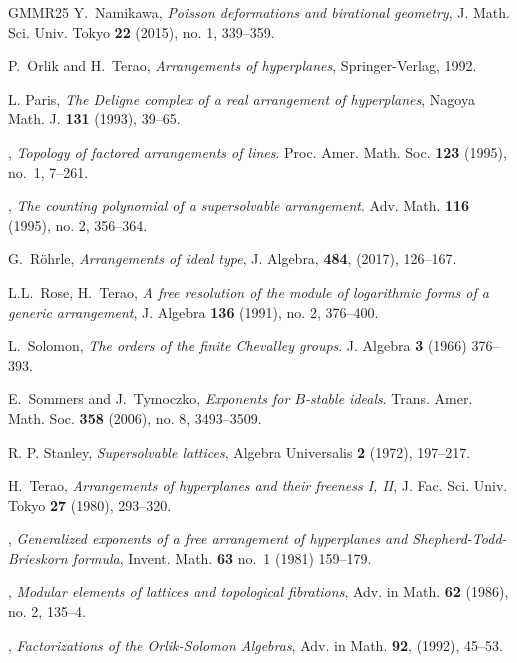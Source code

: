 \documentclass[12pt]{amsart}
\numberwithin{equation}{section}
\theoremstyle{plain}
\theoremstyle{definition}
\begin{document}
\begin{thebibliography}{GMMR25}
  Y.~Namikawa, \emph{Poisson deformations and birational geometry}, J. Math. Sci. Univ. Tokyo \textbf{22} (2015), no. 1, 339--359.

 P.~Orlik and H.~Terao,
  \emph{Arrangements of hyperplanes}, Springer-Verlag, 1992.

L. Paris,
\emph{The Deligne complex of a real arrangement of hyperplanes},
Nagoya Math. J. \textbf{131} (1993), 39--65.

\bysame, %
\emph{Topology of factored arrangements of lines}.
Proc. Amer. Math. Soc. \textbf{123} (1995), no.~1, 7--261.

\bysame, %
\emph{The counting polynomial of a supersolvable arrangement}. 
Adv. Math. \textbf{116} (1995), no. 2, 356--364. 


G.~R\"ohrle,
\emph{Arrangements of ideal type},
J. Algebra, \textbf{484},  (2017), 126--167.


L.L.~Rose, H.~Terao, 
\emph{A free resolution of the module of logarithmic forms of a generic arrangement},
J. Algebra \textbf{136} (1991), no. 2, 376--400.

L.~Solomon, 
\emph{The orders of the finite Chevalley groups}.
J. Algebra \textbf{3} (1966) 376--393. 


E.~Sommers and J.~Tymoczko, 
\emph{Exponents for $B$-stable ideals}. 
Trans. Amer. Math. Soc. \textbf{358} (2006), no. 8, 3493--3509. 

R. P. Stanley, 
\emph{Supersolvable lattices},
Algebra Universalis \textbf{2} (1972), 197--217. 


 H.~Terao, \emph{Arrangements of hyperplanes and
	their freeness I, II}, J. Fac. Sci.  Univ. Tokyo \textbf{27} (1980),
293--320.

\bysame,
\emph{Generalized exponents of a free arrangement of hyperplanes and
	Shepherd-Todd-Brieskorn formula}, Invent. Math. \textbf{63} no.\ 1 (1981) 159--179.

\bysame, %
\emph{Modular elements of lattices and topological fibrations},
Adv. in Math. \textbf{62} (1986), no. 2, 135--4.

\bysame,
\emph{Factorizations of the Orlik-Solomon Algebras},
Adv. in Math. \textbf{92}, (1992), 45--53.


\end{thebibliography}
\end{document}
